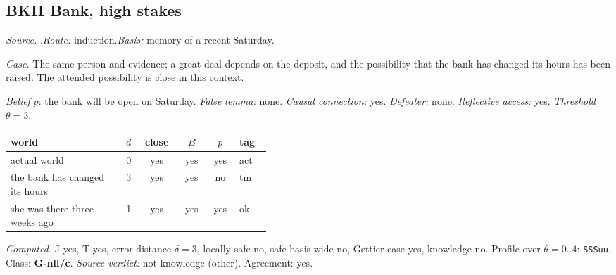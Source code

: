 \subsection*{BKH \enspace Bank, high stakes}
\noindent\textit{Source.} \citet{DeRose1992}.\quad \textit{Route:} induction.\quad \textit{Basis:} memory of a recent Saturday.\par
\noindent\textit{Case.} The same person and evidence; a great deal depends on the deposit, and the possibility that the bank has changed its hours has been raised. The attended possibility is close in this context.\par
\noindent\textit{Belief} $p$: the bank will be open on Saturday.
 \textit{False lemma:} none. \textit{Causal connection:} yes. \textit{Defeater:} none. \textit{Reflective access:} yes. \textit{Threshold} $\theta = 3$.\par
\begin{center}\begin{tabular}{@{}p{0.43\linewidth}rcccl@{}}
world & $d$ & close & $B$ & $p$ & tag \\ \midrule
actual world & 0 & yes & yes & yes & act \\
the bank has changed its hours & 3 & yes & yes & no & tm \\
she was there three weeks ago & 1 & yes & yes & yes & ok \\
\end{tabular}\end{center}
\noindent\textit{Computed.} J yes, T yes, error distance $\delta = 3$, locally safe no, safe basis-wide no, Gettier case yes, knowledge no. Profile over $\theta = 0..4$: \texttt{SSSuu}. Class: \textbf{G-nfl/c}.
 \textit{Source verdict:} not knowledge (other). Agreement: yes.
\par\medskip
{}
